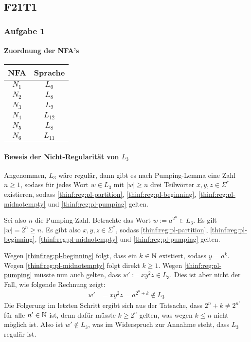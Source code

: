 \subsection{F21T1}

\subsubsection{Aufgabe 1}

\paragraph{Zuordnung der NFA's}
\begin{tabular}{|c|c|}
	\hline
	NFA & Sprache \\
	\hline
	$N_1$ & $L_6$ \\
	\hline
	$N_2$ & $L_8$ \\
	\hline
	$N_3$ & $L_2$ \\
	\hline
	$N_4$ & $L_12$ \\
	\hline
	$N_5$ & $L_8$ \\
	\hline
	$N_6$ & $L_11$ \\
	\hline
\end{tabular}
\par

\paragraph{Beweis der Nicht-Regularität von $L_3$}
Angenommen, $L_3$ wäre regulär, dann gibt es nach Pumping-Lemma eine Zahl $n
\geq 1$, sodass für jedes Wort $w \in L_3$ mit $|w| \geq n$ drei Teilwörter
$x,y,z \in \Sigma^*$ existieren, sodass \eqref{thinf:reg:pl-partition},
\eqref{thinf:reg:pl-beginning}, \eqref{thinf:reg:pl-midnotempty} und
\eqref{thinf:reg:pl-pumping} gelten.

Sei also $n$ die Pumping-Zahl. Betrachte das Wort $w := a^{2^n} \in L_3$. Es
gilt $|w| = 2^n \geq n$. Es gibt also $x,y,z \in \Sigma^*$, sodass
\eqref{thinf:reg:pl-partition}, \eqref{thinf:reg:pl-beginning},
\eqref{thinf:reg:pl-midnotempty} und \eqref{thinf:reg:pl-pumping} gelten.

Wegen \eqref{thinf:reg:pl-beginning} folgt, dass ein $k \in \mathbb{N}$ existiert,
sodass $y = a^k$. Wegen \eqref{thinf:reg:pl-midnotempty} folgt direkt $k \geq
1$. Wegen \eqref{thinf:reg:pl-pumping} müsste nun auch gelten, dass $w' := xy^2z
\in L_3$. Dies ist aber nicht der Fall, wie folgende Rechnung zeigt:
\begin{align*}
	w'
	& = xy^2z
	= a^{2^n + k} \notin L_3
\end{align*}
Die Folgerung im letzten Schritt ergibt sich aus der Tatsache, dass $2^n + k
\neq 2^{n'}$ für alle $n' \in \mathbb{N}$ ist, denn dafür müsste $k \geq 2^n$ gelten,
was wegen $k \leq n$ nicht möglich ist. Also ist $w' \notin L_3$, was im
Widerspruch zur Annahme steht, dass $L_3$ regulär ist.
\par

